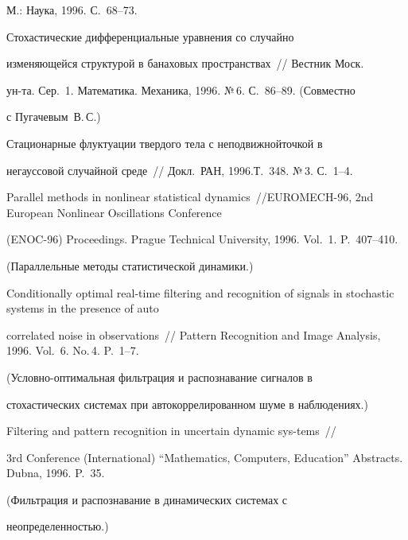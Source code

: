 М.: Наука, 1996. С.~68--73.





 Стохастические дифференциальные уравнения со случайно


изменяющейся структурой в банаховых пространствах~// Вестник Моск.\


 ун-та. Сер.~1. Математика. Механика, 1996. №\,6. С.~86--89. (Совместно


с Пугачевым~В.\,С.)





 Стационарные флуктуации твердого тела с неподвижной\linebreak точкой в


негауссовой случайной среде~// Докл.\ РАН, 1996.\linebreak Т.~348. №\,3. С.~1--4.





Parallel methods in nonlinear statistical dynamics~//\linebreak EUROMECH-96, 2nd European Nonlinear Oscillations Conference


(ENOC-96) Proceedings. Prague Technical University, 1996. Vol.~1. P.~407--410.


(Параллельные методы статистической динамики.)





Conditionally optimal real-time filtering and recognition of signals in stochastic systems in the presence of auto


correlated noise in observations~// Pattern Recognition and Image Analysis, 1996. Vol.~6. No.\,4. P.~1--7.


(Условно-оптимальная фильтрация и распознавание сигналов в


стохастических системах при автокоррелированном шуме в наблюдениях.)





 Filtering and pattern recognition in uncertain dynamic sys-\linebreak tems~//


 3rd Conference (International) ``Mathematics, Computers, Education'' Abstracts. Dubna, 1996. P.~35.


(Фильтрация и распознавание в динамических системах с


неопределенностью.)





